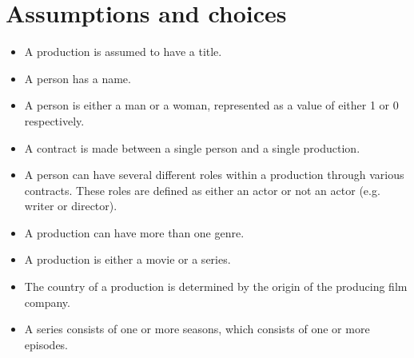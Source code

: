 \section{Assumptions and choices}
\begin{itemize}
	\item A production is assumed to have a title.
	\item A person has a name.
	\item A person is either a man or a woman, represented as a value of either 1 or 0 respectively.
	\item A contract is made between a single person and a single production.
	\item A person can have several different roles within a production through various contracts. These roles are defined as either an actor or not an actor (e.g. writer or director).
	\item A production can have more than one genre.
	\item A production is either a movie or a series.
	\item The country of a production is determined by the origin of the producing film company.
	\item A series consists of one or more seasons, which consists of one or more episodes.
\end{itemize}
